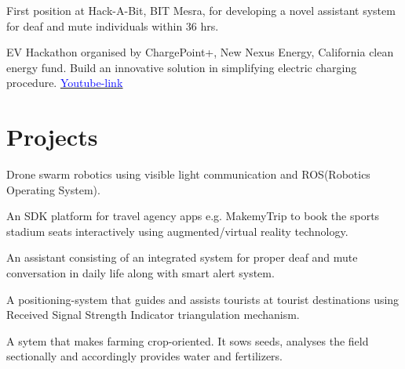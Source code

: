 \documentclass[]{deedy-resume-openfont}
\begin{document}
\begin{minipage}[t]{0.60\textwidth} 




First position at Hack-A-Bit, BIT Mesra, for developing a novel assistant system for deaf and mute individuals within 36 hrs. 
\sectionsep

EV Hackathon organised by ChargePoint+, New Nexus Energy, California clean energy fund. Build an innovative solution in simplifying electric charging procedure. \href{https://www.youtube.com/watch?v=XiB7Tj9RKXk}{\underline{\textcolor{blue}{Youtube-link}}}
\sectionsep

\hline
\section{Projects}

Drone swarm robotics using visible light communication and ROS(Robotics Operating System).
\sectionsep

An SDK platform for travel agency apps e.g. MakemyTrip to book the sports stadium seats interactively using augmented/virtual reality technology.
\sectionsep

An assistant consisting of an integrated system for proper deaf and mute conversation in daily life along with smart alert system. 
\sectionsep


A positioning-system that guides and assists tourists at tourist destinations using Received Signal Strength Indicator triangulation mechanism.
\sectionsep

A sytem that makes farming crop-oriented. It sows seeds, analyses the field sectionally and accordingly provides water and fertilizers.
\sectionsep


\end{minipage}
\end{document}
